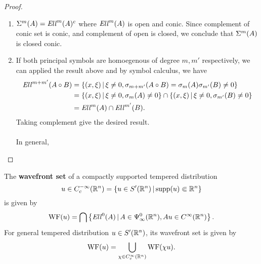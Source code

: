 \documentclass{article}
\begin{document}
\begin{proof}
\begin{enumerate}
        \item $\Sigma^m(A) = \mathit{Ell}^m(A)^c$ where $\mathit{Ell}^m(A)$ is open and conic. Since complement of conic set is conic, and complement of open is closed, we conclude that $\Sigma^m(A)$ is closed conic. 
        
        
        \item If both principal symbols are homoegenous of degree $m, m'$ respectively, we can applied the result above and by symbol calculus, we have
        \begin{align*}
        \mathit{Ell}^{m + m'}(A \circ B) 
        & = \left\{(x, \xi) \, | \, \xi \neq 0, \sigma_{m + m'}(A \circ B) = \sigma_m(A) \sigma_{m'}(B) \neq 0\right\}\\
        & = \left\{(x, \xi) \, | \, \xi \neq 0, \sigma_m(A)  \neq 0\right\} \cap  \left\{(x, \xi) \, | \, \xi \neq 0, \sigma_{m'}(B)  \neq 0\right\} \\
        & = \mathit{Ell}^m(A) \cap \mathit{Ell}^{m'}(B). 
        \end{align*}
        Taking complement give the desired result. \\
        \\
        In general, 
    \end{enumerate}

\end{proof}



\begin{fdefinition}
    The \textbf{wavefront set} of a compactly supported tempered distribution 
    \[
    u \in C^{-\infty}_c({\mathbb R}^n) = \left\{u \in S'({\mathbb R}^n) \, | \, \mathrm{supp}(u) \Subset {\ensuremath {\mathbb R}}^n\right\} 
    \]
    is given by 
    \begin{align*}
    \mathrm{WF}(u) = \bigcap \left\{\mathit{Ell}^0(A) \, | \, A \in \Psi^0_\infty({\mathbb R}^n), Au \in C^\infty({\mathbb R}^n)\right\}. 
    \end{align*}
    For general tempered distribution $u \in S'({\mathbb R}^n)$, its wavefront set is given by 
    \begin{align*}
    \mathrm{WF}(u) = \bigcup_{\chi \in C^\infty_c({\mathbb R}^n)} \mathrm{WF}(\chi u). 
    \end{align*}
\end{fdefinition} 
\end{document}
